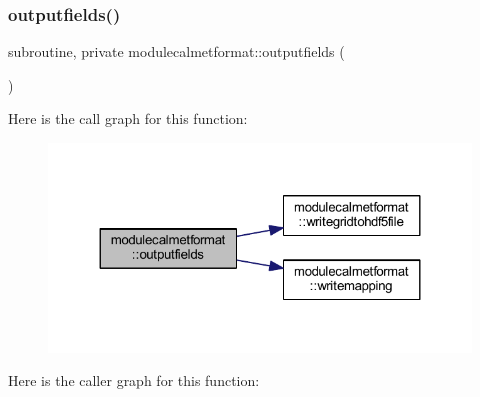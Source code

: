 \mbox{\label{namespacemodulecalmetformat_a77546a7a587e6ab71724b1a5ebb7e709}} 
\subsubsection{\texorpdfstring{outputfields()}{outputfields()}}
{\footnotesize\ttfamily subroutine, private modulecalmetformat\+::outputfields (\begin{DoxyParamCaption}{ }\end{DoxyParamCaption})\hspace{0.3cm}{\ttfamily [private]}}

Here is the call graph for this function\+:\nopagebreak
\begin{figure}[H]
\begin{center}
\leavevmode
\includegraphics[width=324pt]{namespacemodulecalmetformat_a77546a7a587e6ab71724b1a5ebb7e709_cgraph}
\end{center}
\end{figure}
Here is the caller graph for this function\+:\nopagebreak
